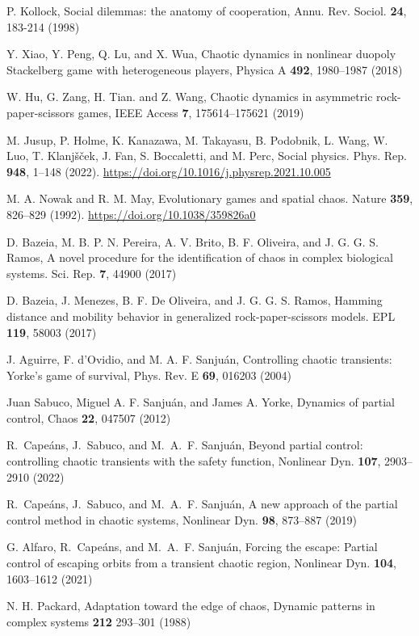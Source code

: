 \begin{thebibliography}{01}


P. Kollock, Social dilemmas: the anatomy of cooperation,
Annu. Rev. Sociol. \textbf{24}, 183-214 (1998)

Y. Xiao, Y. Peng, Q. Lu, and X. Wua, Chaotic dynamics in nonlinear duopoly Stackelberg game with heterogeneous players,
Physica A \textbf{492}, 1980--1987 (2018)

W. Hu, G. Zang, H. Tian. and Z. Wang, Chaotic dynamics in asymmetric rock-paper-scissors games, IEEE Access \textbf{7}, 175614--175621 (2019)


\raggedright
M. Jusup, P. Holme, K. Kanazawa,  M. Takayasu, B. Podobnik, L. Wang,  W. Luo, T. Klanjšček, J. Fan,  S. Boccaletti, and M. Perc,
Social physics.
Phys. Rep. \textbf{948}, 1--148 (2022). 
\url{https://doi.org/10.1016/j.physrep.2021.10.005}

\raggedright
M. A. Nowak and R. M. May,
Evolutionary games and spatial chaos. 
Nature \textbf{359}, 826--829 (1992).
\url{https://doi.org/10.1038/359826a0}



\raggedright
D. Bazeia, M. B. P. N. Pereira, A. V. Brito, B. F. Oliveira, and J. G. G. S. Ramos,
A novel procedure for the identification of chaos in complex biological systems.
Sci. Rep. \textbf{7}, 44900 (2017)

\raggedright
D. Bazeia, J. Menezes, B. F. De Oliveira, and J. G. G. S. Ramos,
Hamming distance and mobility behavior in generalized rock-paper-scissors models.
EPL \textbf{119}, 58003 (2017)



J. Aguirre, F. d’Ovidio, and M. A. F. Sanjuán,
Controlling chaotic transients: Yorke’s game of survival,
Phys. Rev. E \textbf{69}, 016203
(2004)

Juan Sabuco, Miguel A. F. Sanjuán,  and James A. Yorke,
Dynamics of partial control,
Chaos \textbf{22}, 047507
(2012)

R.~Cape{\'a}ns, J.~Sabuco, and M.~A.~F. Sanju{\'a}n, 
Beyond partial control: controlling chaotic transients
with the safety function,
Nonlinear Dyn. \textbf{107}, 2903--2910
(2022)


R.~Cape{\'a}ns, J.~Sabuco, and M.~A.~F. Sanju{\'a}n, 
A new approach of the partial control method in chaotic systems,
Nonlinear Dyn. \textbf{98}, 873--887
(2019)


G. Alfaro, R.~Cape{\'a}ns, and M.~A.~F. Sanju{\'a}n, 
Forcing the escape: Partial control of escaping orbits from a
transient chaotic region,
Nonlinear Dyn. \textbf{104}, 1603--1612
(2021) 


N. H. Packard,
Adaptation toward the edge of chaos,
Dynamic patterns in complex systems \textbf{212} 293--301
(1988)





\end{thebibliography}

